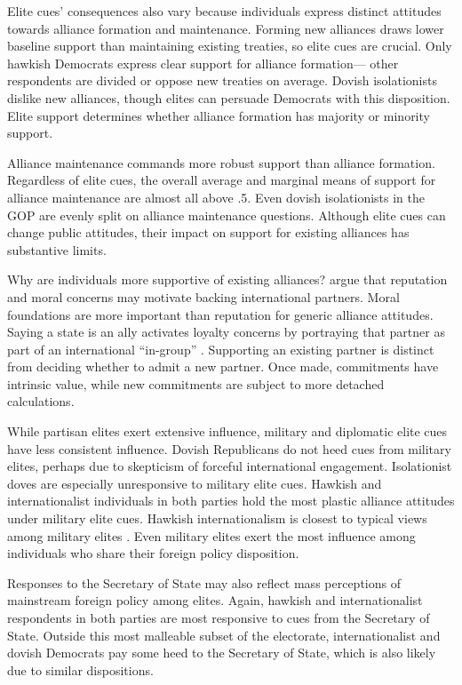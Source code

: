 \documentclass[12pt]{article}
\begin{document}
Elite cues' consequences also vary because individuals express distinct attitudes towards alliance formation and maintenance. 
Forming new alliances draws lower baseline support than maintaining existing treaties, so elite cues are crucial. 
Only hawkish Democrats express clear support for alliance formation--- other respondents are divided or oppose new treaties on average.
Dovish isolationists dislike new alliances, though elites can persuade Democrats with this disposition. 
Elite support determines whether alliance formation has majority or minority support. 


Alliance maintenance commands more robust support than alliance formation. 
Regardless of elite cues, the overall average and marginal means of support for alliance maintenance are almost all above .5. 
Even dovish isolationists in the GOP are evenly split on alliance maintenance questions.
Although elite cues can change public attitudes, their impact on support for existing alliances has substantive limits.


Why are individuals more supportive of existing alliances?
\citet{TomzWeeks2021} argue that reputation and moral concerns may motivate backing international partners.
Moral foundations are more important than reputation for generic alliance attitudes. 
Saying a state is an ally activates loyalty concerns by portraying that partner as part of an international ``in-group'' \citep[pg. 814]{TomzWeeks2021}. 
Supporting an existing partner is distinct from deciding whether to admit a new partner.
Once made, commitments have intrinsic value, while new commitments are subject to more detached calculations.


While partisan elites exert extensive influence, military and diplomatic elite cues have less consistent influence. 
Dovish Republicans do not heed cues from military elites, perhaps due to skepticism of forceful international engagement.
Isolationist doves are especially unresponsive to military elite cues.
Hawkish and internationalist individuals in both parties hold the most plastic alliance attitudes under military elite cues.
Hawkish internationalism is closest to typical views among military elites \citep{ZwaldBerejikian2021}. 
Even military elites exert the most influence among individuals who share their foreign policy disposition. 


Responses to the Secretary of State may also reflect mass perceptions of mainstream foreign policy among elites.
Again, hawkish and internationalist respondents in both parties are most responsive to cues from the Secretary of State.
Outside this most malleable subset of the electorate, internationalist and dovish Democrats pay some heed to the Secretary of State, which is also likely due to similar dispositions.
\end{document}
